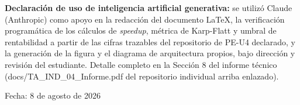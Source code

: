 \documentclass[11pt,a4paper]{article}
\begin{document}
\vspace{1.2cm}
\noindent\textbf{Declaraci\'on de uso de inteligencia artificial generativa:} se utiliz\'o
Claude (Anthropic) como apoyo en la redacci\'on del documento LaTeX, la verificaci\'on
program\'atica de los c\'alculos de \textit{speedup}, m\'etrica de Karp-Flatt y umbral de
rentabilidad a partir de las cifras trazables del repositorio de PE-U4 declarado, y la
generaci\'on de la figura y el diagrama de arquitectura propios, bajo direcci\'on y revisi\'on
del estudiante. Detalle completo en la Secci\'on 8 del informe t\'ecnico (docs/TA\_IND\_04\_Informe.pdf
del repositorio individual arriba enlazado).

\vfill
\begin{center}
\small Fecha: 8 de agosto de 2026
\end{center}
\end{document}
